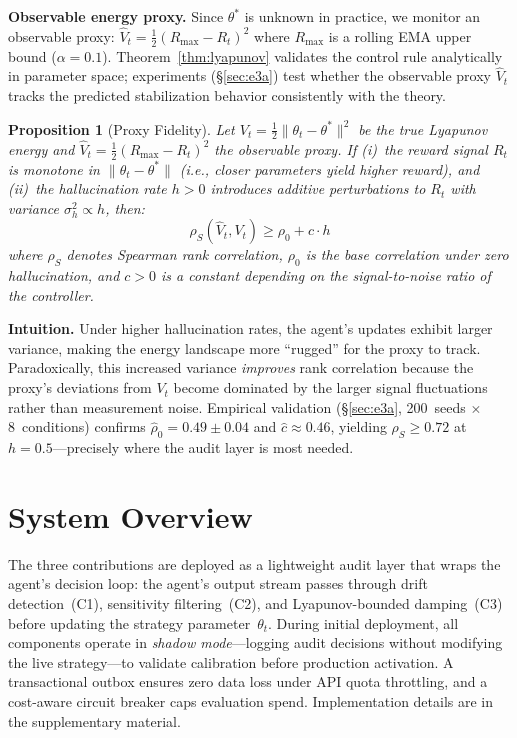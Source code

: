 \documentclass{article}
\newtheorem{proposition}{Proposition}
\begin{document}
\textbf{Observable energy proxy.} Since $\theta^*$ is unknown in
practice, we monitor an observable proxy:
$\hat{V}_t = \tfrac{1}{2}(R_{\max} - R_t)^2$
where $R_{\max}$ is a rolling EMA upper bound ($\alpha = 0.1$).
Theorem~\ref{thm:lyapunov} validates the control rule analytically
in parameter space; experiments (\S\ref{sec:e3a}) test whether the
observable proxy $\hat{V}_t$ tracks the predicted stabilization
behavior consistently with the theory.

\begin{proposition}[Proxy Fidelity]
\label{prop:proxy-fidelity}
Let $V_t = \frac{1}{2}\|\theta_t - \theta^*\|^2$ be the true Lyapunov
energy and $\hat{V}_t = \frac{1}{2}(R_{\max} - R_t)^2$ the observable
proxy. If (i)~the reward signal $R_t$ is monotone in
$\|\theta_t - \theta^*\|$ (i.e., closer parameters yield higher
reward), and (ii)~the hallucination rate $h > 0$ introduces additive
perturbations to $R_t$ with variance $\sigma_h^2 \propto h$, then:
\begin{equation}
  \rho_S(\hat{V}_t, V_t) \geq \rho_0 + c \cdot h
  \label{eq:proxy-bound}
\end{equation}
where $\rho_S$ denotes Spearman rank correlation, $\rho_0$ is the
base correlation under zero hallucination, and $c > 0$ is a constant
depending on the signal-to-noise ratio of the controller.
\end{proposition}

\textbf{Intuition.} Under higher hallucination rates, the agent's
updates exhibit larger variance, making the energy landscape more
``rugged'' for the proxy to track. Paradoxically, this increased
variance \emph{improves} rank correlation because the proxy's
deviations from $V_t$ become dominated by the larger signal
fluctuations rather than measurement noise.
Empirical validation (\S\ref{sec:e3a}, 200~seeds $\times$ 8~conditions)
confirms $\hat{\rho}_0 = 0.49 \pm 0.04$ and $\hat{c} \approx 0.46$,
yielding $\rho_S \geq 0.72$ at $h{=}0.5$---precisely where the audit
layer is most needed.

\section{System Overview}
\label{sec:system}

The three contributions are deployed as a lightweight audit layer
that wraps the agent's decision loop: the agent's output stream
passes through drift detection~(C1), sensitivity filtering~(C2),
and Lyapunov-bounded damping~(C3) before updating the strategy
parameter~$\theta_t$. During initial deployment, all components
operate in \emph{shadow mode}---logging audit decisions without
modifying the live strategy---to validate calibration before
production activation.
A transactional outbox ensures zero data loss under API quota
throttling, and a cost-aware circuit breaker caps evaluation spend.
Implementation details are in the supplementary material.
\end{document}
